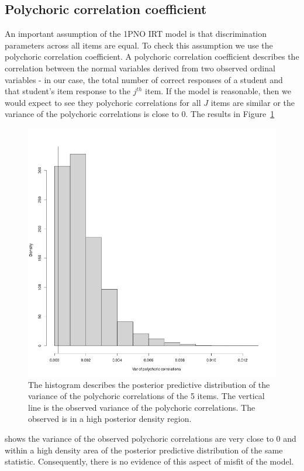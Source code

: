 \documentclass[floatsintext, man]{apa7}
\begin{document}
\subsection{Polychoric correlation coefficient}
An important assumption of the 1PNO IRT model is that discrimination parameters
across all items are equal. To check this assumption we use the polychoric
correlation coefficient. A polychoric correlation coefficient describes the
correlation between the normal variables derived from two observed ordinal
variables - in our case, the total number of correct responses of a student and
that student's item response to the $j^{th}$ item. If the model is reasonable,
then we would expect to see they polychoric correlations for all $J$ items are
similar or the variance of the polychoric correlations is close to 0. The
results in Figure~\ref{fig:ppmc_polycor}
\begin{figure}
  \centering
  \includegraphics[scale=0.4]{Fig/ppmc_polycor.png}
  \caption{The histogram describes the posterior predictive distribution of the
  variance of the polychoric correlations of the 5 items. The vertical line is
  the observed variance of the polychoric correlations. The observed is in a
  high posterior density region.}
  \label{fig:ppmc_polycor}
\end{figure}
shows the variance of the observed polychoric correlations are very close to 0
and within a high density area of the posterior predictive distribution of the
same statistic. Consequently, there is no evidence of this aspect of misfit of
the model.
\end{document}
